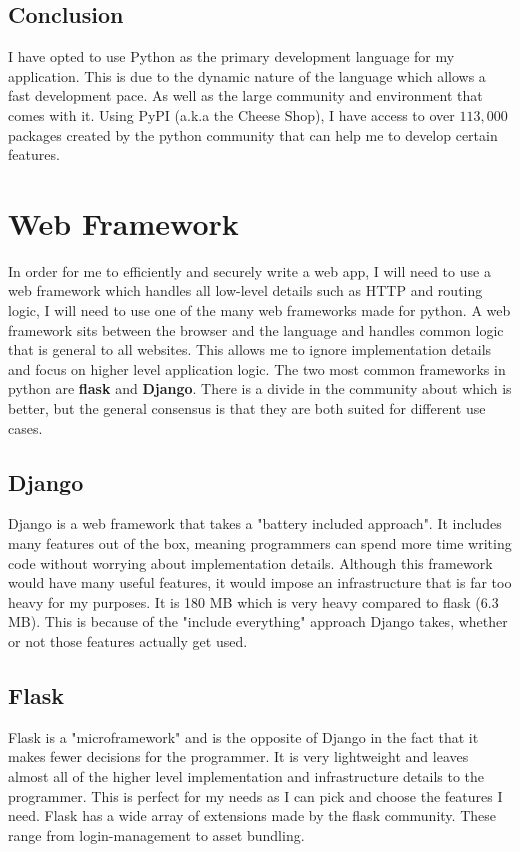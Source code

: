 \documentclass[a4paper,oneside,12pt,draft]{report}
\begin{document}
	\subsection{Conclusion}
	I have opted to use Python as the primary development language for my application. This is due to the dynamic nature of the language which allows a 
	fast development pace. As well as the large community and environment that comes with it. Using PyPI (a.k.a the Cheese Shop), I have access to over \(113,000\) packages created by the python community that can help me to develop certain features.

	\section{Web Framework}
	In order for me to efficiently and securely write a web app, I will need to use a web framework which handles all low-level details such as HTTP and routing logic, I will need to use one of the many web frameworks made for python. A web framework sits between the browser and the language and handles common logic that is general to all websites. This allows me to ignore implementation details and focus on higher level application logic. The two most common frameworks in python are \textbf{flask} and \textbf{Django}. There is a divide in the community about which is better, but the general consensus is that they are both suited for different use cases.

	\subsection{Django}
	Django is a web framework that takes a "battery included approach". It includes many features out of the box, meaning programmers can spend more time writing code without worrying about implementation details. Although this framework would have many useful features, it would impose an infrastructure that is far too heavy for my purposes. It is 180 MB which is very heavy compared to flask (6.3 MB). This is because of the "include everything" approach Django takes, whether or not those features actually get used.

	\subsection{Flask}
	Flask is a "microframework" and is the opposite of Django in the fact that it makes fewer decisions for the programmer. It is very lightweight and leaves almost all of the higher level implementation and infrastructure details to the programmer. This is perfect for my needs as I can pick and choose the features I need. Flask has a wide array of extensions made by the flask community. These range from login-management to asset bundling.
	
\end{document}
